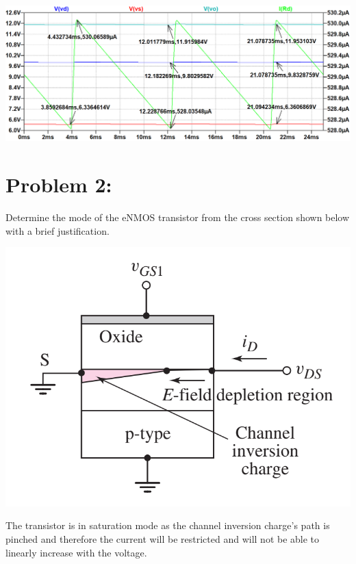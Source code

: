 \documentclass[12pt,letterpaper,titlepage]{article}
\begin{document}
\begin{raggedright}
\begin{center}
\includegraphics[width=\textwidth, height=\textheight, keepaspectratio=true]{ds1c}

\end{center}
\clearpage

\section{Problem 2: } 
Determine the mode of the eNMOS transistor from the cross section shown below with a brief justification.

\begin{center}
\includegraphics[width=.4\textwidth, height=\textheight, keepaspectratio=true]{ds2}
\end{center}

The transistor is in saturation mode as the channel inversion charge's path is pinched and therefore the current will be restricted and will not be able to linearly increase with the voltage. 

\end{raggedright}
\end{document}
